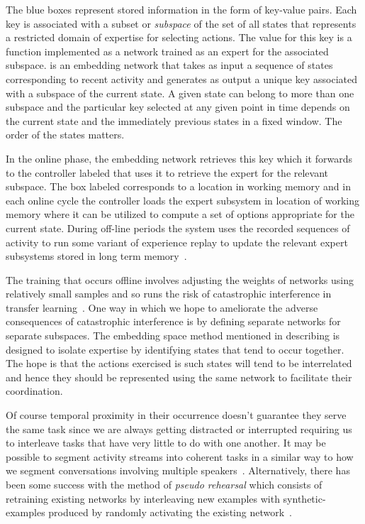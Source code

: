 The blue boxes represent stored information in the form of key-value pairs. Each key is associated with a subset or {\it{subspace}} of the set of all states that represents a restricted domain of expertise for selecting actions. The value for this key is a function implemented as a network trained as an expert for the associated subspace.  is an embedding network that takes as input a sequence of states corresponding to recent activity and generates as output a unique key associated with a subspace of the current state. A given state can belong to more than one subspace and the particular key selected at any given point in time depends on the current state and the immediately previous states in a fixed window. The order of the states matters. 

In the online phase, the embedding network retrieves this key which it forwards to the controller labeled  that uses it to retrieve the expert for the relevant subspace. The box labeled  corresponds to a location in working memory and in each online cycle the  controller loads the expert subsystem in location  of working memory where it can be utilized to compute a set of options appropriate for the current state. During off-line periods the system uses the recorded sequences of activity to run some variant of experience replay to update the relevant expert subsystems stored in long term memory~\cite{AndrychowiczetalCoRR-17,SchauletalCoRR-15,LinML-92}.

The training that occurs offline involves adjusting the weights of networks using relatively small samples and so runs the risk of catastrophic interference in transfer learning~\cite{McClellandetalPR-95}. One way in which we hope to ameliorate the adverse consequences of catastrophic interference is by defining separate networks for separate subspaces. The embedding space method mentioned in describing  is designed to isolate expertise by identifying states that tend to occur together. The hope is that the actions exercised is such states will tend to be interrelated and hence they should be represented using the same network to facilitate their coordination. 

Of course temporal proximity in their occurrence doesn't guarantee they serve the same task since we are always getting distracted or interrupted requiring us to interleave tasks that have very little to do with one another. It may be possible to segment activity streams into coherent tasks in a similar way to how we segment conversations involving multiple speakers~\cite{SeldinetalICSS-01,SeldinetalICML-01}. Alternatively, there has been some success with the method of {\it{pseudo rehearsal}} which consists of retraining existing networks by interleaving new examples with synthetic-examples produced by randomly activating the existing network~\cite{ZhiyuanandBingLML-18,KirkpatricketalCoRR-16,AnsetalCSS-02,FrenchTiCS-99,FrenchCONNECTION-SCIENCE-97,RobinsCONNECTION-SCIENCE-95}.

